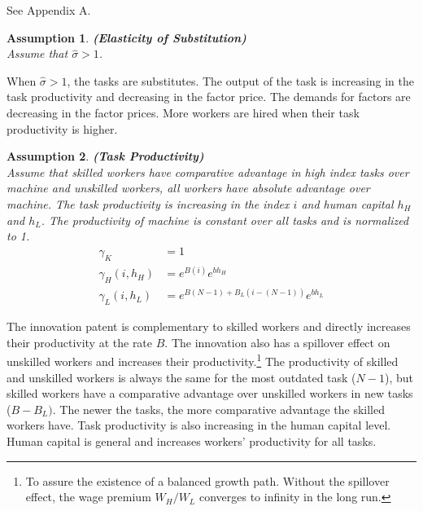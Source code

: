 \documentclass[12pt]{article}
\newtheorem{assumption}{Assumption}
\begin{document}
 See Appendix A.

\begin{assumption}{\bf (Elasticity of Substitution)} \\

Assume that $\hat{\sigma}>1$.
\end{assumption}

When $\hat{\sigma}>1$, the tasks are substitutes. The output of the task is increasing in the task productivity and decreasing in the factor price. The demands for factors are decreasing in the factor prices. More workers are hired when their task productivity is higher. 


\begin{assumption}{\bf (Task Productivity)} \\

Assume that skilled workers have comparative advantage in high index tasks over machine and unskilled workers, all workers have absolute advantage over machine. The task productivity is increasing in the index $i$ and human capital $h_H$ and $h_L$. The productivity of machine is constant over all tasks and is normalized to 1. 
\begin{align*}
\gamma_K &= 1 \\
\gamma_H(i,h_H) &=e^{B(i)} e^{bh_H} \\
\gamma_L(i,h_L) &= e^{B(N-1)+B_L(i-(N-1))} e^{bh_L}
\end{align*}
\end{assumption}

The innovation patent is complementary to skilled workers and directly increases their productivity at the rate $B$. The innovation also has a spillover effect on unskilled workers and increases their productivity.\footnote{To assure the existence of a balanced growth path. Without the spillover effect, the wage premium $W_H/W_L$ converges to infinity in the long run.} The productivity of skilled and unskilled workers is always the same for the most outdated task ($N-1$), but skilled workers have a comparative advantage over unskilled workers in new tasks ($B-B_L)$. The newer the tasks, the more comparative advantage the skilled workers have. Task productivity is also increasing in the human capital level. Human capital is general and increases workers' productivity for all tasks.  
\end{document}
